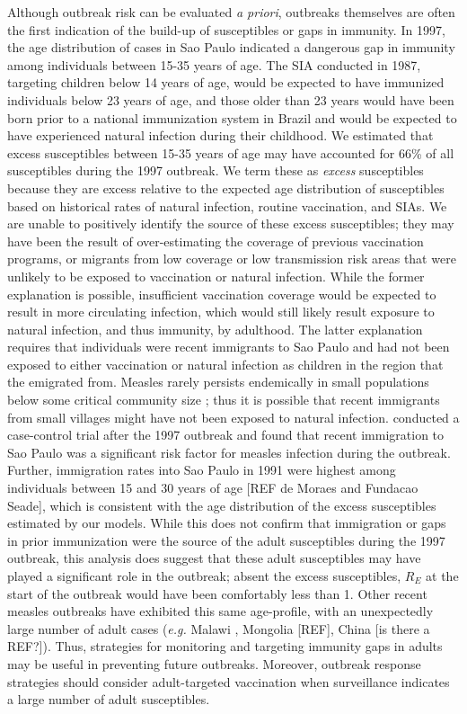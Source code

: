 Although outbreak risk can be evaluated \emph{a priori}, outbreaks themselves are often the first indication of the build-up of susceptibles or gaps in immunity. In 1997, the age distribution of cases in Sao Paulo indicated a dangerous gap in immunity among individuals between 15-35 years of
age. The SIA conducted in 1987, targeting children below 14 years of age, would be expected to have immunized individuals below 23 years of
age, and those older than 23 years would have been born prior to a national immunization system in Brazil and would be expected
to have experienced natural infection during their childhood. We estimated that excess susceptibles between 15-35 years of age may have accounted for 66\% of all susceptibles during the 1997 outbreak. We term these as \emph{excess} susceptibles because they are
excess relative to the expected age distribution of susceptibles based on historical rates of natural infection, routine vaccination, and SIAs. We are unable to positively identify the source of these excess susceptibles; they may have been the result of over-estimating the coverage of previous
vaccination programs, or migrants from low coverage or low transmission risk areas that were unlikely to be exposed to vaccination or natural infection. While the former explanation is possible, insufficient vaccination coverage would be expected to result in more circulating infection, which would still likely result exposure to natural infection, and thus immunity, by adulthood. The latter explanation requires that individuals were recent immigrants to Sao Paulo and had not been exposed to either vaccination or natural infection as children in the region that the emigrated from. Measles rarely persists endemically in small populations below some critical community size \cite{Conlan_2007, Keeling_1997}; thus it is possible that recent immigrants from small villages might have not been exposed to natural infection. \citet{Camargo_2000} conducted a case-control trial after the 1997 outbreak and found that recent immigration to Sao Paulo was a significant risk factor for measles infection during the outbreak. Further, immigration rates into Sao Paulo in 1991 were highest among individuals between 15 and 30 years of age  {[}REF de Moraes and Fundacao
Seade{]}, which is consistent with the age distribution of the excess susceptibles estimated by our models. While this does not confirm that
immigration or gaps in prior immunization were the source of the adult susceptibles during the 1997 outbreak, this analysis does suggest that
these adult susceptibles may have played a significant role in the outbreak; absent the excess susceptibles, $R_E$ at the start of the outbreak would have been comfortably less than 1. Other recent measles outbreaks have exhibited this same age-profile, with an unexpectedly large number of adult cases (\emph{e.g.} Malawi \cite{Minetti_2013}, Mongolia {[}REF{]}, China {[}is there a REF?{]}). Thus, strategies for monitoring and targeting immunity gaps in adults may be useful in preventing future outbreaks. Moreover, outbreak response strategies should consider adult-targeted vaccination when surveillance indicates a large number of adult susceptibles.


